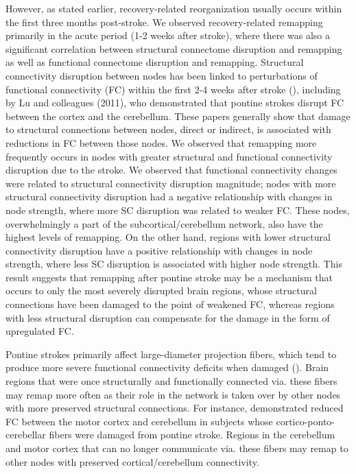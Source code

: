 \documentclass[phd,tocprelim]{cornell}
\begin{document}
    However, as stated earlier, recovery-related reorganization usually occurs within the first three months post-stroke. We observed recovery-related remapping primarily in the acute period (1-2 weeks after stroke), where there was also a significant correlation between structural connectome disruption and remapping as well as functional connectome disruption and remapping. Structural connectivity disruption between nodes has been linked to perturbations of functional connectivity (FC) within the first 2-4 weeks after stroke (\cite{Griffis2019-cy, Griffis2020-hx, Wodeyar2020-kz}), including by Lu and colleagues (2011), who demonstrated that pontine strokes disrupt FC between the cortex and the cerebellum. These papers generally show that damage to structural connections between nodes, direct or indirect, is associated with reductions in FC between those nodes. We observed that remapping more frequently occurs in nodes with greater structural and functional connectivity disruption due to the stroke. We observed that functional connectivity changes were related to structural connectivity disruption magnitude; nodes with more structural connectivity disruption had a negative relationship with changes in node strength, where more SC disruption was related to weaker FC. These nodes, overwhelmingly a part of the subcortical/cerebellum network, also have the highest levels of remapping. On the other hand, regions with lower structural connectivity disruption have a positive relationship with changes in node strength, where less SC disruption is associated with higher node strength. This result suggests that remapping after pontine stroke may be a mechanism that occurs to only the most severely disrupted brain regions, whose structural connections have been damaged to the point of weakened FC, whereas regions with less structural disruption can compensate for the damage in the form of upregulated FC. 
    
    Pontine strokes primarily affect large-diameter projection fibers, which tend to produce more severe functional connectivity deficits when damaged (\cite{Griffis2020-hx}). Brain regions that were once structurally and functionally connected via. these fibers may remap more often as their role in the network is taken over by other nodes with more preserved structural connections. For instance, \cite{Lu2011-ow} demonstrated reduced FC between the motor cortex and cerebellum in subjects whose cortico-ponto-cerebellar fibers were damaged from pontine stroke. Regions in the cerebellum and motor cortex that can no longer communicate via. these fibers may remap to other nodes with preserved cortical/cerebellum connectivity.
    
\end{document}
